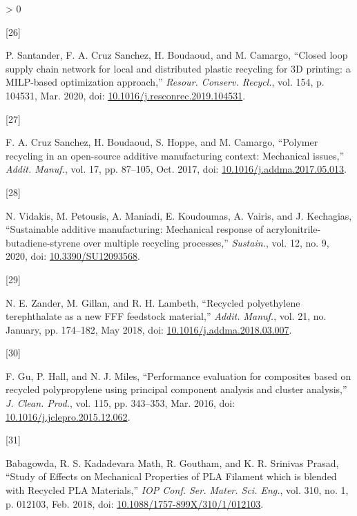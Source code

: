 \documentclass[conference,final,]{IEEEtran}
\newlength{\csllabelwidth}
\newlength{\cslhangindent}
\newenvironment{CSLReferences}[3] %
 {%
  \setlength{\parindent}{0pt}
  \ifodd #1 \everypar{\setlength{\hangindent}{\cslhangindent}}\ignorespaces\fi
  \ifnum #2 > 0
  \setlength{\parskip}{#2\baselineskip}
  \fi
 }%
 {}
\newcommand{\CSLLeftMargin}[1]{\parbox[t]{\csllabelwidth}{#1}}
\newcommand{\CSLRightInline}[1]{\parbox[t]{\linewidth - \csllabelwidth}{#1}}
\begin{document}
\begin{CSLReferences}{0}{0}
\leavevmode\hypertarget{ref-Santander2020}{}%
\CSLLeftMargin{{[}26{]} }
\CSLRightInline{P. Santander, F. A. Cruz Sanchez, H. Boudaoud, and M.
Camargo, {``{Closed loop supply chain network for local and distributed
plastic recycling for 3D printing: a MILP-based optimization
approach},''} \emph{Resour. Conserv. Recycl.}, vol. 154, p. 104531, Mar.
2020, doi:
\href{https://doi.org/10.1016/j.resconrec.2019.104531}{10.1016/j.resconrec.2019.104531}.}

\leavevmode\hypertarget{ref-CruzSanchez2017}{}%
\CSLLeftMargin{{[}27{]} }
\CSLRightInline{F. A. Cruz Sanchez, H. Boudaoud, S. Hoppe, and M.
Camargo, {``{Polymer recycling in an open-source additive manufacturing
context: Mechanical issues},''} \emph{Addit. Manuf.}, vol. 17, pp.
87--105, Oct. 2017, doi:
\href{https://doi.org/10.1016/j.addma.2017.05.013}{10.1016/j.addma.2017.05.013}.}

\leavevmode\hypertarget{ref-Vidakis2020}{}%
\CSLLeftMargin{{[}28{]} }
\CSLRightInline{N. Vidakis, M. Petousis, A. Maniadi, E. Koudoumas, A.
Vairis, and J. Kechagias, {``{Sustainable additive manufacturing:
Mechanical response of acrylonitrile-butadiene-styrene over multiple
recycling processes},''} \emph{Sustain.}, vol. 12, no. 9, 2020, doi:
\href{https://doi.org/10.3390/SU12093568}{10.3390/SU12093568}.}

\leavevmode\hypertarget{ref-Zander2018}{}%
\CSLLeftMargin{{[}29{]} }
\CSLRightInline{N. E. Zander, M. Gillan, and R. H. Lambeth, {``{Recycled
polyethylene terephthalate as a new FFF feedstock material},''}
\emph{Addit. Manuf.}, vol. 21, no. January, pp. 174--182, May 2018, doi:
\href{https://doi.org/10.1016/j.addma.2018.03.007}{10.1016/j.addma.2018.03.007}.}

\leavevmode\hypertarget{ref-Gu2016}{}%
\CSLLeftMargin{{[}30{]} }
\CSLRightInline{F. Gu, P. Hall, and N. J. Miles, {``{Performance
evaluation for composites based on recycled polypropylene using
principal component analysis and cluster analysis},''} \emph{J. Clean.
Prod.}, vol. 115, pp. 343--353, Mar. 2016, doi:
\href{https://doi.org/10.1016/j.jclepro.2015.12.062}{10.1016/j.jclepro.2015.12.062}.}

\leavevmode\hypertarget{ref-Babagowda2018}{}%
\CSLLeftMargin{{[}31{]} }
\CSLRightInline{Babagowda, R. S. Kadadevara Math, R. Goutham, and K. R.
Srinivas Prasad, {``{Study of Effects on Mechanical Properties of PLA
Filament which is blended with Recycled PLA Materials},''} \emph{IOP
Conf. Ser. Mater. Sci. Eng.}, vol. 310, no. 1, p. 012103, Feb. 2018,
doi:
\href{https://doi.org/10.1088/1757-899X/310/1/012103}{10.1088/1757-899X/310/1/012103}.}


\end{CSLReferences}
\end{document}
